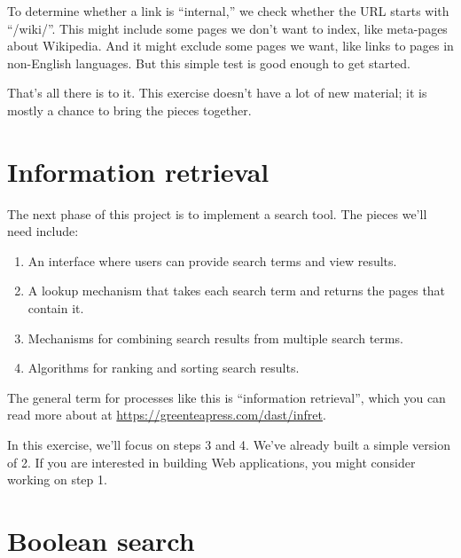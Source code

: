 \documentclass[12pt]{book}
\theoremstyle{exercise}
\begin{document}
To determine whether a link is ``internal,'' we check whether the URL
starts with ``/wiki/''. This might include some pages we don't want to
index, like meta-pages about Wikipedia. And it might exclude some pages
we want, like links to pages in non-English languages. But this simple
test is good enough to get started.


That's all there is to it. This exercise doesn't have a lot of new material;
it is mostly a chance to bring the pieces together.


\section{Information retrieval}
\label{information-retrieval}


The next phase of this project is to implement a search tool. The pieces
we'll need include:

\begin{enumerate}

\item
  An interface where users can provide search terms and view results.

\item
  A lookup mechanism that takes each search term and returns the pages
  that contain it.

\item
  Mechanisms for combining search results from multiple search terms.

\item
  Algorithms for ranking and sorting search results.

\end{enumerate}

The general term for processes like this is ``information retrieval'',
which you can read more about at 
\url{https://greenteapress.com/dast/infret}.

In this exercise, we'll focus on steps 3 and 4. We've already built a simple
version of 2. If you are interested in building Web applications, you
might consider working on step 1.


\section{Boolean search}
\label{boolean-search}

\end{document}
